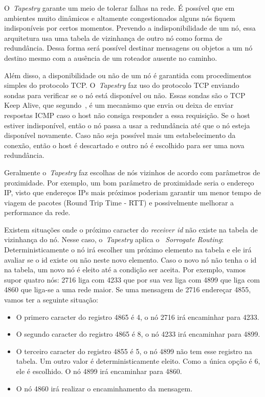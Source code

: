 O~\emph{Tapestry} garante um meio de tolerar falhas na rede. É possível que em ambientes muito dinâmicos e altamente congestionados alguns nós fiquem indisponíveis por certos momentos. Prevendo a indisponibilidade de um nó, essa arquitetura usa uma tabela de vizinhança de outro nó como forma de redundância. Dessa forma será possível destinar mensagens ou objetos a um nó destino mesmo com a ausência de um roteador ausente no caminho.

Além disso, a disponibilidade ou não de um nó é garantida com procedimentos simples do protocolo TCP. O~\emph{Tapestry} faz uso do protocolo TCP enviando sondas para verificar se o nó está disponível ou não. Essas sondas são o TCP Keep Alive, que segundo~\cite{stevens93}, é um mecanismo que envia ou deixa de enviar respostas ICMP caso o host não consiga responder a essa requisição. Se o host estiver indisponível, então o nó passa a usar a redundância até que o nó esteja disponível novamente. Caso não seja possível mais um estabelecimento da conexão, então o host é descartado e outro nó é escolhido para ser uma nova redundância.

Geralmente o~\emph{Tapestry} faz escolhas de nós vizinhos de acordo com parâmetros de proximidade. Por exemplo, um bom parâmetro de proximidade seria o endereço IP, visto que endereços IPs mais próximos poderiam garantir um menor tempo de viagem de pacotes (Round Trip Time - RTT) e possivelmente melhorar a performance da rede.

Existem situações onde o próximo caracter do \emph{receiver id} não existe na tabela de vizinhança do nó. Nesse caso, o~\emph{Tapestry} aplica o ~\emph{Sorrogate Routing}: Deterministicamente o nó irá escolher um próximo elemento na tabela e ele irá avaliar se o id existe ou não neste novo elemento. Caso o novo nó não tenha o id na tabela, um novo nó é eleito até a condição ser aceita. Por exemplo, vamos supor quatro nós: 2716 liga com 4233 que por sua vez liga com 4899 que liga com 4860 que liga-se a uma rede maior. Se uma mensagem de 2716 endereçar 4855, vamos ter a seguinte situação:
\begin{itemize}
	\item O primero caracter do registro 4865 é 4, o nó 2716 irá encaminhar para 4233.
	\item O segundo caracter do registro 4865 é 8, o nó 4233 irá encaminhar para 4899.
	\item O terceiro caracter do registro 4855 é 5, o nó 4899 não tem esse registro na tabela. Um outro valor é deterministicamente eleito. Como a única opção é 6, ele é escolhido. O nó 4899 irá encaminhar para 4860.
	\item O nó 4860 irá realizar o encaminhamento da mensagem.
\end{itemize}

